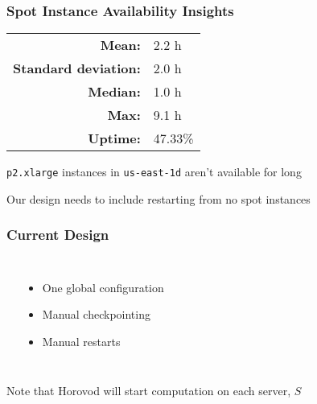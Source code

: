   \begin{frame}
    \frametitle{Spot Instance Availability Insights}

    \begin{tabular}{rl}
      \textbf{Mean:}               & 2.2 h   \\
      \textbf{Standard deviation:} & 2.0 h   \\
      \textbf{Median:}             & 1.0 h   \\
      \textbf{Max:}                & 9.1 h   \\
      \textbf{Uptime:}             & 47.33\% \\
    \end{tabular}

    \vspace{3em}

    \texttt{p2.xlarge} instances in \texttt{us-east-1d} aren't available for long

    \vspace{1em}

    Our design needs to include restarting from no spot instances
  \end{frame}

  \begin{frame}
    \frametitle{Current Design}

    \begin{columns}
      \begin{flushright}
      \end{flushright}
      \begin{itemize}
        \item One global configuration
        \item Manual checkpointing
        \item Manual restarts
      \end{itemize}
    \end{columns}

    \vspace{3em}

    \hspace{7em} Note that Horovod will start computation on each server, $S$
  \end{frame}

